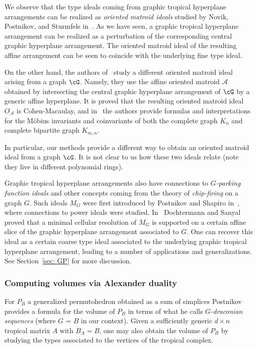 \begin{remark}
We observe that the type ideals coming from graphic tropical hyperplane arrangements can be realized as \emph{oriented matroid ideals} studied by Novik, Postnikov, and Sturmfels in~\cite{NPS}.
As we have seen, a graphic tropical hyperplane arrangement can be realized as a perturbation of the corresponding central graphic hyperplane arrangement.  The oriented matroid ideal of the resulting affine arrangement can be seen to coincide with the underlying fine type ideal. 

On the other hand, the authors of~\cite{NPS} study a different oriented matroid ideal arising from a graph $\cG$.  Namely, they use the affine oriented matroid ${\mathcal A}$ obtained by intersecting the central graphic hyperplane arrangement of $\cG$ by a generic affine hyperplane.  It is proved that the resulting oriented matroid ideal $O_{\mathcal A}$ is  Cohen-Macaulay, and in~\cite{NPS} the authors provide formulas and interpretations for the M\"obius invariants and coinvariants of both the complete graph $K_n$ and complete bipartite graph $K_{m,n}$.  

In particular, our methods provide a different way to obtain an oriented matroid ideal from a graph $\cG$.  It is not clear to us how these two ideals relate (note they live in different polynomial rings).
\end{remark}

Graphic tropical hyperplane arrangements also have connections to \emph{$G$-parking function ideals} and other concepts coming from the theory of \emph{chip-firing} on a graph $G$.  Such ideals $M_G$ were first introduced by Postnikov and Shapiro in~\cite{postnikovshapiro}, where connections to power ideals were studied. In~\cite{DocSan} Dochtermann and Sanyal proved that a minimal cellular resolution of $M_G$ is supported on a certain affine slice of the graphic hyperplane arrangement associated to $G$.  One can recover this ideal as a certain coarse type ideal associated to the underlying graphic tropical hyperplane arrangement, leading to a number of applications and generalizations.  See Section~\ref{sec: GP} for more discussion.

\subsubsection{Computing volumes via Alexander duality}
For $P_B$ a generalized permutohedron obtained as a sum of simplices Postnikov~\cite[Theorem 9.3]{postnikov2009permutohedra} provides a formula for the volume of $P_B$ in terms of what he calls \emph{$G$-draconian sequences} (where $G$ = $B$ in our context). Given a sufficiently generic $d\times n$ tropical matrix $A$ with $B_A = B$, one may also obtain the volume of $P_B$ by studying the types associated to the vertices of the tropical complex.


